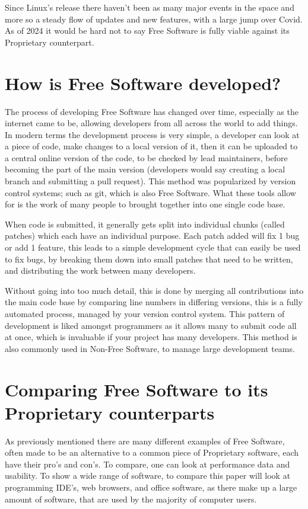 \documentclass[a4paper,12pt]{article}
\begin{document}
{Since Linux's release there haven't been as many major events in the space and more so a steady flow of updates
and new features, with a large jump over Covid. As of 2024 it would be hard not to say Free Software is fully
viable against its Proprietary counterpart.

\section{How is Free Software developed?} The process of developing Free Software has changed over time, especially
as the internet came to be, allowing developers from all across the world to add things. In modern terms the
development process is very simple, a developer can look at a piece of code, make changes to a local version of
it, then it can be uploaded to a central online version of the code, to be checked by lead maintainers, before
becoming the part of the main version (developers would say creating a local branch and submitting a pull request).
This method was popularized by version control systems; such as git\cite{GIT}, which is also Free Software.
What these tools allow for is the work of many people to brought together into one single code base.

When code is submitted, it generally gets split into individual chunks (called patches) which each have an individual
purpose. Each patch added will fix 1 bug or add 1 feature, this leads to a simple development cycle that can easily
be used to fix bugs, by breaking them down into small patches that need to be written, and distributing the work
between many developers.

Without going into too much detail, this is done by merging all contributions into the main code base by
comparing line numbers in differing versions, this is a fully automated process, managed by your version control
system. This pattern of development is liked amongst programmers as it allows many to submit code all at once,
which is invaluable if your project has many developers. This method is also commonly used in Non-Free Software,
to manage large development teams\cite{NONFREEvcs}.

\section{Comparing Free Software to its Proprietary counterparts} As previously mentioned there are many different
examples of Free Software, often made to be an alternative to a common piece of Proprietary software, each have
their pro's and con's. To compare, one can look at performance data and usability. To show a wide range of software,
to compare this paper will look at programming IDE's, web browsers, and office software, as there make up a large
amount of software, that are used by the majority of computer users.

}
\end{document}
